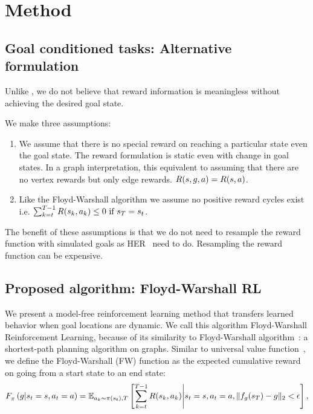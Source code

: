 \section{Method}
\subsection{Goal conditioned tasks: Alternative formulation}
Unlike \citet{andrychowicz2016learning}, we do not believe that reward
information is meaningless without achieving the desired goal state.

We make three assumptions:
\begin{enumerate}
\item We assume that there is no special reward
  on reaching a particular state even the goal state. The reward formulation is
  static even with change in goal states.
  In a graph interpretation, this equivalent to assuming that there are no
  vertex rewards but only edge rewards.
  $R(s, g, a) = R(s, a)$.
\item Like the Floyd-Warshall algorithm we assume no positive reward cycles
  exist i.e. $  \sum_{k=t}^{T-1} R(s_k, a_k) \le 0 \text{ if }s_T = s_t$.
\end{enumerate}

The benefit of these assumptions is that we do not need to resample the reward
function with simulated goals as HER~\cite{andrychowicz2016learning} need to do.
Resampling the reward function can be expensive.

\subsection{Proposed algorithm: Floyd-Warshall RL}

We present a model-free reinforcement learning method that transfers
learned behavior when goal locations are dynamic. We call this algorithm
Floyd-Warshall Reinforcement Learning, because of its similarity to
Floyd-Warshall algorithm~\cite{floydwarshall1962}:
a shortest-path planning algorithm on graphs. Similar
to universal value function~\cite{schaul2015universal}, we define the Floyd-Warshall
(FW) function as the expected cumulative reward on going from a start
state to an end state:
%
\begin{align}
F_{\pi}^{}\left({g}\middle|{s_t = s}, {a_t = a}\right) =
\mathbb{E}_{a_k \sim \pi(s_t),T}\left[ \sum_{k=t}^{T-1} R(s_k, a_k) \middle\vert s_t = s, a_t = a, \|f_g(s_T) - g\|_2 < \epsilon \right] ,
\end{align}%
%


